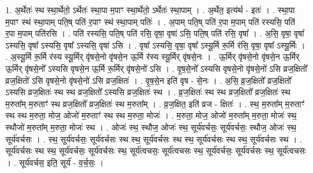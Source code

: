 \documentclass[17pt]{extarticle}
\begin{document}
1. अ॒र्थेतः॑ स्थ स्था॒र्थेतो॒ ऽर्थेतः॑ स्था॒पा म॒पाꣳ स्था॒र्थेतो॒ ऽर्थेतः॑ स्था॒पाम् । . अ॒र्थेत॒ इत्य॑र्थ - इतः॑ । . स्था॒पा म॒पाꣳ स्थ॑ स्था॒पाम् पति॒ष् पति॑ र॒पाꣳ स्थ॑ स्था॒पाम् पतिः॑ । . अ॒पाम् पति॒ष् पति॑ र॒पा म॒पाम् पति॑ रस्यसि॒ पति॑ र॒पा म॒पाम् पति॑रसि । . पति॑ रस्यसि॒ पति॒ष् पति॑ रसि॒ वृषा॒ वृषा॑ ऽसि॒ पति॒ष् पति॑ रसि॒ वृषा᳚ । . अ॒सि॒ वृषा॒ वृषा᳚ ऽस्यसि॒ वृषा᳚ ऽस्यसि॒ वृषा᳚ ऽस्यसि॒ वृषा॑ ऽसि । . वृषा᳚ ऽस्यसि॒ वृषा॒ वृषा᳚ ऽस्यू॒र्मि रू॒र्मि र॑सि॒ वृषा॒ वृषा᳚ ऽस्यू॒र्मिः । . अ॒स्यू॒र्मि रू॒र्मि र॑स्य स्यू॒र्मिर् वृ॑षसे॒नो वृ॑षसे॒न ऊ॒र्मि र॑स्य स्यू॒र्मिर् वृ॑षसे॒नः । . ऊ॒र्मिर् वृ॑षसे॒नो वृ॑षसे॒न ऊ॒र्मिर् ऊ॒र्मिर् वृ॑षसे॒नो᳚ ऽस्यसि वृषसे॒न ऊ॒र्मि रू॒र्मिर् वृ॑षसे॒नो॑ ऽसि । . वृ॒ष॒से॒नो᳚ ऽस्यसि वृषसे॒नो वृ॑षसे॒नो॑ ऽसि व्रज॒क्षितो᳚ व्रज॒क्षितो॑ ऽसि वृषसे॒नो वृ॑षसे॒नो॑ ऽसि व्रज॒क्षितः॑ । . वृ॒ष॒से॒न इति॑ वृष - से॒नः । . अ॒सि॒ व्र॒ज॒क्षितो᳚ व्रज॒क्षितो᳚ ऽस्यसि व्रज॒क्षितः॑ स्थ स्थ व्रज॒क्षितो᳚ ऽस्यसि व्रज॒क्षितः॑ स्थ । . व्र॒ज॒क्षितः॑ स्थ स्थ व्रज॒क्षितो᳚ व्रज॒क्षितः॑ स्थ म॒रुता᳚म् म॒रुताꣳ॑ स्थ व्रज॒क्षितो᳚ व्रज॒क्षितः॑ स्थ म॒रुता᳚म् । . व्र॒ज॒क्षित॒ इति॑ व्रज - क्षितः॑ । . स्थ॒ म॒रुता᳚म् म॒रुताꣳ॑ स्थ स्थ म॒रुता॒ मोज॒ ओजो॑ म॒रुताꣳ॑ स्थ स्थ म॒रुता॒ मोजः॑ । . म॒रुता॒ मोज॒ ओजो॑ म॒रुता᳚म् म॒रुता॒ मोजः॑ स्थ॒ स्थौजो॑ म॒रुता᳚म् म॒रुता॒ मोजः॑ स्थ । . ओजः॑ स्थ॒ स्थौज॒ ओजः॑ स्थ॒ सूर्य॑वर्चसः॒ सूर्य॑वर्चसः॒ स्थौज॒ ओजः॑ स्थ॒ सूर्य॑वर्चसः । . स्थ॒ सूर्य॑वर्चसः॒ सूर्य॑वर्चसः स्थ स्थ॒ सूर्य॑वर्चसः स्थ स्थ॒ सूर्य॑वर्चसः स्थ स्थ॒ सूर्य॑वर्चसः स्थ । . सूर्य॑वर्चसः स्थ स्थ॒ सूर्य॑वर्चसः॒ सूर्य॑वर्चसः स्थ॒ सूर्य॑त्वचसः॒ सूर्य॑त्वचसः स्थ॒ सूर्य॑वर्चसः॒ सूर्य॑वर्चसः स्थ॒ सूर्य॑त्वचसः । . सूर्य॑वर्चस॒ इति॒ सूर्य॑ - व॒र्च॒सः॒ । \newline
\end{document}
